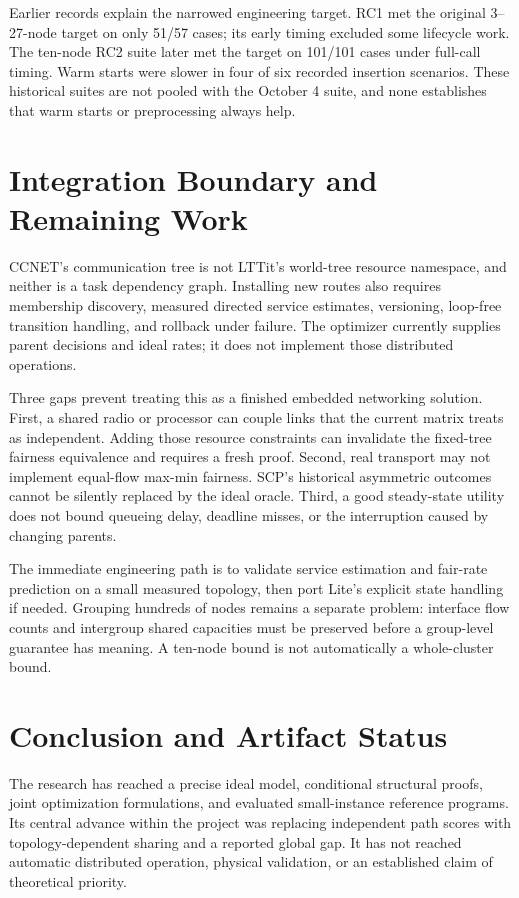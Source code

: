\documentclass[conference,letterpaper]{IEEEtran}
\begin{document}
Earlier records explain the narrowed engineering target. RC1 met the original 3--27-node target on only 51/57 cases; its early timing excluded some lifecycle work. The ten-node RC2 suite later met the target on 101/101 cases under full-call timing. Warm starts were slower in four of six recorded insertion scenarios. These historical suites are not pooled with the October 4 suite, and none establishes that warm starts or preprocessing always help.

\section{Integration Boundary and Remaining Work}
CCNET's communication tree is not LTTit's world-tree resource namespace, and neither is a task dependency graph. Installing new routes also requires membership discovery, measured directed service estimates, versioning, loop-free transition handling, and rollback under failure. The optimizer currently supplies parent decisions and ideal rates; it does not implement those distributed operations.

Three gaps prevent treating this as a finished embedded networking solution. First, a shared radio or processor can couple links that the current matrix treats as independent. Adding those resource constraints can invalidate the fixed-tree fairness equivalence and requires a fresh proof. Second, real transport may not implement equal-flow max-min fairness. SCP's historical asymmetric outcomes cannot be silently replaced by the ideal oracle. Third, a good steady-state utility does not bound queueing delay, deadline misses, or the interruption caused by changing parents.

The immediate engineering path is to validate service estimation and fair-rate prediction on a small measured topology, then port Lite's explicit state handling if needed. Grouping hundreds of nodes remains a separate problem: interface flow counts and intergroup shared capacities must be preserved before a group-level guarantee has meaning. A ten-node bound is not automatically a whole-cluster bound.

\section{Conclusion and Artifact Status}
The research has reached a precise ideal model, conditional structural proofs, joint optimization formulations, and evaluated small-instance reference programs. Its central advance within the project was replacing independent path scores with topology-dependent sharing and a reported global gap. It has not reached automatic distributed operation, physical validation, or an established claim of theoretical priority.
\end{document}
